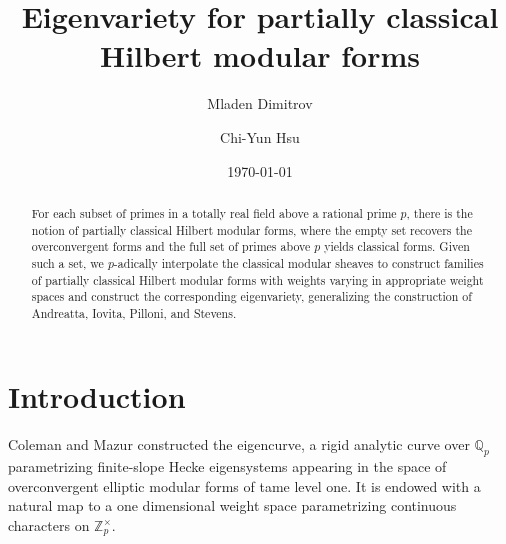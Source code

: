 \documentclass[11pt]{amsart}
\theoremstyle{definition} %
\theoremstyle{plain} %
\theoremstyle{remark} %
\newcommand{\QQ}{{\mathbb Q}}
\newcommand{\ZZ}{{\mathbb Z}}
\begin{document}
\title{Eigenvariety for partially classical Hilbert modular forms}
\author{Mladen Dimitrov}
\address{Laboratoire Paul Painlev\'e, Universit\'e de Lille, 59000 Lille, France}

\author{Chi-Yun Hsu}
\address{Department of Mathematics and Computer Science, Santa Clara University, Santa Clara, CA 95053, USA}


\date{\today}



\begin{abstract}
For each subset of primes in a totally real field  above  a rational prime  $p$, there is the notion of partially classical Hilbert modular forms, where the empty set  recovers the overconvergent forms and the full set of primes above $p$ yields classical forms.
Given such a set, we $p$-adically interpolate the classical modular sheaves to construct families of partially classical Hilbert modular forms with weights varying in appropriate weight spaces and construct the corresponding eigenvariety, generalizing the construction of Andreatta, Iovita, Pilloni, and Stevens. 
\end{abstract}

\maketitle


  


\section*{Introduction}
Coleman and Mazur \cite{CM98} constructed the eigencurve, a rigid analytic curve over $\QQ_p$  parametrizing finite-slope Hecke eigensystems  appearing in the space of overconvergent elliptic modular forms of tame level one. It is endowed with a natural map to  a one dimensional weight space parametrizing continuous characters on $\ZZ_p^\times$. 
 
\end{document}
